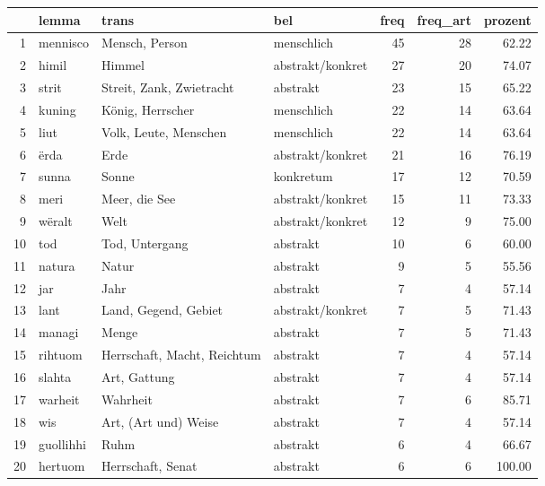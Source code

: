 \begin{tabular}{rlllrrr}
  \hline
 & lemma & trans & bel & freq & freq\_art & prozent \\ 
  \hline
1 & mennisco & Mensch, Person & menschlich &  45 &  28 & 62.22 \\ 
  2 & himil & Himmel & abstrakt/konkret &  27 &  20 & 74.07 \\ 
  3 & strit & Streit, Zank, Zwietracht & abstrakt &  23 &  15 & 65.22 \\ 
  4 & kuning & König, Herrscher & menschlich &  22 &  14 & 63.64 \\ 
  5 & liut & Volk, Leute, Menschen & menschlich &  22 &  14 & 63.64 \\ 
  6 & ërda & Erde & abstrakt/konkret &  21 &  16 & 76.19 \\ 
  7 & sunna & Sonne & konkretum &  17 &  12 & 70.59 \\ 
  8 & meri & Meer, die See & abstrakt/konkret &  15 &  11 & 73.33 \\ 
  9 & wëralt & Welt & abstrakt/konkret &  12 &   9 & 75.00 \\ 
  10 & tod & Tod, Untergang & abstrakt &  10 &   6 & 60.00 \\ 
  11 & natura & Natur & abstrakt &   9 &   5 & 55.56 \\ 
  12 & jar & Jahr & abstrakt &   7 &   4 & 57.14 \\ 
  13 & lant & Land, Gegend, Gebiet & abstrakt/konkret &   7 &   5 & 71.43 \\ 
  14 & managi & Menge & abstrakt &   7 &   5 & 71.43 \\ 
  15 & rihtuom & Herrschaft, Macht, Reichtum & abstrakt &   7 &   4 & 57.14 \\ 
  16 & slahta & Art, Gattung & abstrakt &   7 &   4 & 57.14 \\ 
  17 & warheit & Wahrheit & abstrakt &   7 &   6 & 85.71 \\ 
  18 & wis & Art, (Art und) Weise & abstrakt &   7 &   4 & 57.14 \\ 
  19 & guollihhi & Ruhm & abstrakt &   6 &   4 & 66.67 \\ 
  20 & hertuom & Herrschaft, Senat & abstrakt &   6 &   6 & 100.00 \\ 
   \hline
\end{tabular}
